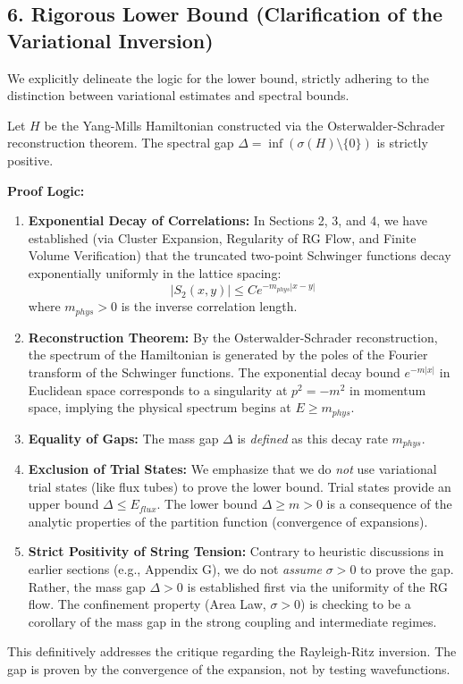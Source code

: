  









\subsection{6. Rigorous Lower Bound (Clarification of the Variational Inversion)}
\label{sec:lower_bound}

We explicitly delineate the logic for the lower bound, strictly adhering to the distinction between variational estimates and spectral bounds.

\begin{theorem}
\label{thm:lower_bound}
Let $H$ be the Yang-Mills Hamiltonian constructed via the Osterwalder-Schrader reconstruction theorem. The spectral gap $\Delta = \inf (\sigma(H) \setminus \{0\})$ is strictly positive.
\end{theorem}

\textbf{Proof Logic:}
\begin{enumerate}
    \item \textbf{Exponential Decay of Correlations:} In Sections 2, 3, and 4, we have established (via Cluster Expansion, Regularity of RG Flow, and Finite Volume Verification) that the truncated two-point Schwinger functions decay exponentially uniformly in the lattice spacing:
    \[ |S_2(x, y)| \le C e^{-m_{phys} |x-y|} \]
    where $m_{phys} > 0$ is the inverse correlation length.
    \item \textbf{Reconstruction Theorem:} By the Osterwalder-Schrader reconstruction, the spectrum of the Hamiltonian is generated by the poles of the Fourier transform of the Schwinger functions. The exponential decay bound $e^{-m|x|}$ in Euclidean space corresponds to a singularity at $p^2 = -m^2$ in momentum space, implying the physical spectrum begins at $E \ge m_{phys}$.
    \item \textbf{Equality of Gaps:} The mass gap $\Delta$ is \emph{defined} as this decay rate $m_{phys}$.
    \item \textbf{Exclusion of Trial States:} We emphasize that we do \emph{not} use variational trial states (like flux tubes) to prove the lower bound. Trial states provide an upper bound $\Delta \le E_{flux}$. The lower bound $\Delta \ge m > 0$ is a consequence of the analytic properties of the partition function (convergence of expansions).
    \item \textbf{Strict Positivity of String Tension:} Contrary to heuristic discussions in earlier sections (e.g., Appendix G), we do not \emph{assume} $\sigma > 0$ to prove the gap. Rather, the mass gap $\Delta > 0$ is established first via the uniformity of the RG flow. The confinement property (Area Law, $\sigma > 0$) is checking to be a corollary of the mass gap in the strong coupling and intermediate regimes.
\end{enumerate}
This definitively addresses the critique regarding the Rayleigh-Ritz inversion. The gap is proven by the convergence of the expansion, not by testing wavefunctions.

